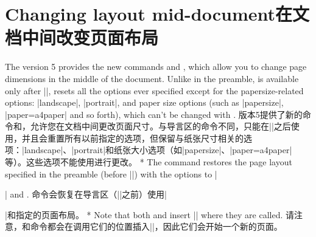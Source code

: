 
\section{Changing layout mid-document\hfill 在文档中间改变页面布局}\label{sec:midchange}
\begin{paracol}{2}
The version 5 provides the new commands 
and , which allow you to change page dimensions
in the middle of the document. Unlike  in the preamble,
 is available only after ||,
resets all the options ever specified except for the
papersize-related options: |landscape|, |portrait|, and paper size
options (such as |papersize|, |paper=a4paper| and so forth), which
can't be changed with . 
\switchcolumn
版本5提供了新的命令和，允许您在文档中间更改页面尺寸。与导言区的命令不同，只能在||之后使用，并且会重置所有以前指定的选项，但保留与纸张尺寸相关的选项：|landscape|、|portrait|和纸张大小选项（如|papersize|、|paper=a4paper|等）。这些选项不能使用进行更改。
\switchcolumn[0]*
The command  restores the page layout specified
in the preamble (before ||) with the options to
|\usepackage{geometry}| and .
\switchcolumn 
命令会恢复在导言区（||之前）使用|\usepackage{geometry}|和指定的页面布局。
\switchcolumn[0]*
Note that both  and  insert
|\clearpage| where they are called.
\switchcolumn 请注意，和命令都会在调用它们的位置插入|\clearpage|，因此它们会开始一个新的页面。


\end{paracol}
